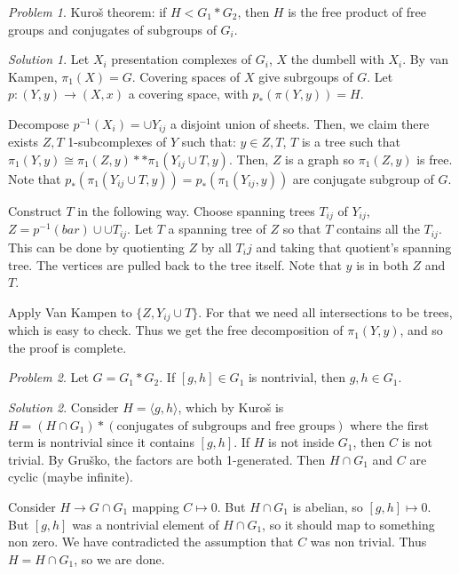 \documentclass[11pt]{article}
\theoremstyle{definition}
\theoremstyle{example}
\theoremstyle{remark}
\theoremstyle{lemma}
\theoremstyle{proposition}
\theoremstyle{Problem}
\newtheorem{problem}{Problem}[section]
\theoremstyle{Solution}
\newtheorem{solution}{Solution}[section]
\theoremstyle{theorem}
\theoremstyle{corollary}
\begin{document}
\begin{problem}
Kuro\v{s} theorem: if $H < G_1*G_2$, then $H$ is the free product of free groups and conjugates of subgroups of $G_i$.
\end{problem}
\begin{solution}
Let $X_i$ presentation complexes of $G_i$, $X$ the dumbell with $X_i$. By van Kampen, $\pi_1(X)= G$. Covering spaces of $X$ give subrgoups of $G$. Let $p:(Y,y)\to (X,x)$ a covering space, with $p_*(\pi(Y,y))=H$.
 
Decompose $p^{-1}(X_i)=\cup Y_{ij}$ a disjoint union of sheets. Then, we claim there exists $Z,T$ 1-subcomplexes of $Y$ such that: $y\in Z,T$, $T$ is a tree such that $\pi_1(Y,y)\cong \pi_1(Z,y)\ast \ast \pi_1(Y_{ij} \cup T, y)$. Then, $Z$ is a graph so $\pi_1(Z,y)$ is free. Note that $p_*(\pi_1(Y_{ij}\cup T, y)) = p_*(\pi_1(Y_{ij}, y))$ are conjugate subgroup of $G$.

Construct $T$ in the following way. Choose spanning trees $T_{ij}$ of $Y_{ij}$, $Z=p^{-1}(bar)\cup \cup T_{ij}$. Let $T$ a spanning tree of $Z$ so that $T$ contains all the $T_{ij}$. This can be done by quotienting $Z$ by all $T_ij$ and taking that quotient's spanning tree. The vertices are pulled back to the tree itself. Note that $y$ is in both $Z$ and $T$.

Apply Van Kampen to $\{Z, Y_{ij}\cup T\}$. For that we need all intersections to be trees, which is easy to check. Thus we get the free decomposition of $\pi_1(Y,y)$, and so the proof is complete.\\
\end{solution}

\begin{problem}
Let $G= G_1*G_2$. If $[g,h]\in G_1$ is nontrivial, then $g,h\in G_1$.
\end{problem}
\begin{solution}
Consider $H=\langle g, h\rangle$, which by Kuro\v{s} is $H=(H\cap G_1)*(\text{conjugates of subgroups and free groups})$ where the first term is nontrivial since it contains $[g,h]$. If $H$ is not inside $G_1$, then $C$ is not trivial. By Gru\v{s}ko, the factors are both 1-generated. Then $H\cap G_1$ and $C$ are cyclic (maybe infinite). 

Consider $H\to G\cap G_1$ mapping $C\mapsto 0$. But $H\cap G_1$ is abelian, so $[g,h]\mapsto 0$. But $[g,h]$ was a nontrivial element of $H\cap G_1$, so it should map to something non zero. We have contradicted the assumption that $C$ was non trivial. Thus $H=H\cap G_1$, so we are done.\\
\end{solution}
\end{document}
